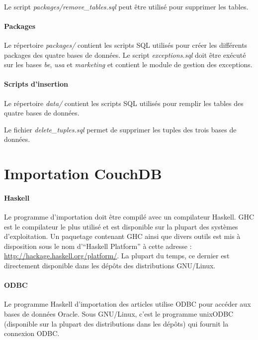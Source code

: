 \documentclass[a4paper,12pt,french]{article}
\begin{document}
    \paragraph{}
    Le script \textit{packages/remove\_tables.sql} peut être utilisé pour 
supprimer les tables.

    \paragraph{Packages}
    Le répertoire \textit{packages/} contient les scripts SQL utilisés pour
créer les différents packages des quatre bases de données. Le script
\textit{exceptions.sql} doit être exécuté sur les bases \textit{be}, 
\textit{usa} et \textit{marketing} et contient le module de gestion des 
exceptions.

    \paragraph{Scripts d'insertion}
    Le répertoire \textit{data/} contient les scripts SQL utilisés pour
remplir les tables des quatre bases de données.
    
    Le fichier \textit{delete\_tuples.sql} permet de supprimer les tuples des
trois bases de données.

\section{Importation CouchDB}

    \paragraph{Haskell}
    Le programme d'importation doit être compilé avec un compilateur Haskell.
GHC est le compilateur le plus utilisé et est disponible sur la plupart des
systèmes d'exploitation. Un paquetage contenant GHC ainsi que divers outils est
mis à disposition sous le nom d'\enquote{Haskell Platform} à cette adresse :
\url{http://hackage.haskell.org/platform/}. La plupart du temps, ce dernier est
directement disponible dans les dépôts des distributions GNU/Linux.

    \paragraph{ODBC}
    Le programme Haskell d'importation des articles utilise ODBC pour accéder
aux bases de données Oracle. Sous GNU/Linux, c'est le programme unixODBC
(disponible sur la plupart des distributions dans les dépôts) qui fournit la
connexion ODBC.
\end{document}
